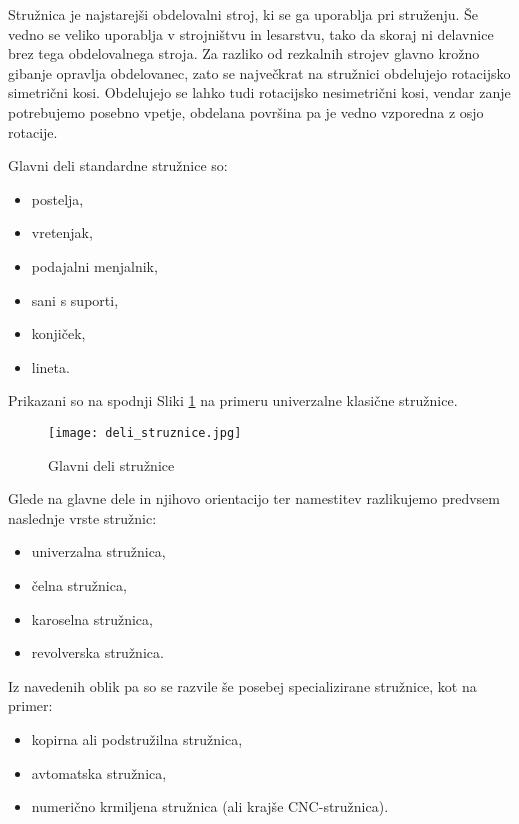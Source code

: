 Stružnica je najstarejši obdelovalni stroj,
ki se ga uporablja pri struženju. Še vedno se
veliko uporablja v strojništvu in lesarstvu,
tako da skoraj ni delavnice brez tega obdelovalnega stroja.
Za razliko od rezkalnih strojev glavno krožno gibanje opravlja
obdelovanec, zato se največkrat na stružnici obdelujejo rotacijsko
simetrični kosi. Obdelujejo se lahko tudi rotacijsko nesimetrični kosi,
vendar zanje potrebujemo posebno vpetje, obdelana površina pa je
vedno vzporedna z osjo rotacije.

\noindent Glavni deli standardne stružnice so:
\begin{itemize}
	\item postelja,
	\item vretenjak,
	\item podajalni menjalnik,
	\item sani s suporti,
	\item konjiček,
	\item lineta.
\end{itemize}

Prikazani so na spodnji Sliki \ref{img:deli_struznice} na primeru univerzalne klasične stružnice.
\begin{figure}[H]
	\begin{center}
		\texttt{[image: deli\_struznice.jpg]}
		\caption{Glavni deli stružnice
			\cite{deli_struznice}}
		\label{img:deli_struznice}
	\end{center}
\end{figure}

\noindent Glede na glavne dele in njihovo orientacijo ter namestitev razlikujemo
predvsem naslednje vrste stružnic:
\begin{itemize}
	\item univerzalna stružnica,
	\item čelna stružnica,
	\item karoselna stružnica,
	\item revolverska stružnica.
\end{itemize}

\noindent Iz navedenih oblik pa so se razvile še posebej specializirane
stružnice, kot na primer:
\begin{itemize}
	\item kopirna ali podstružilna stružnica,
	\item avtomatska stružnica,
	\item numerično krmiljena stružnica (ali krajše CNC-stružnica).
\end{itemize}

